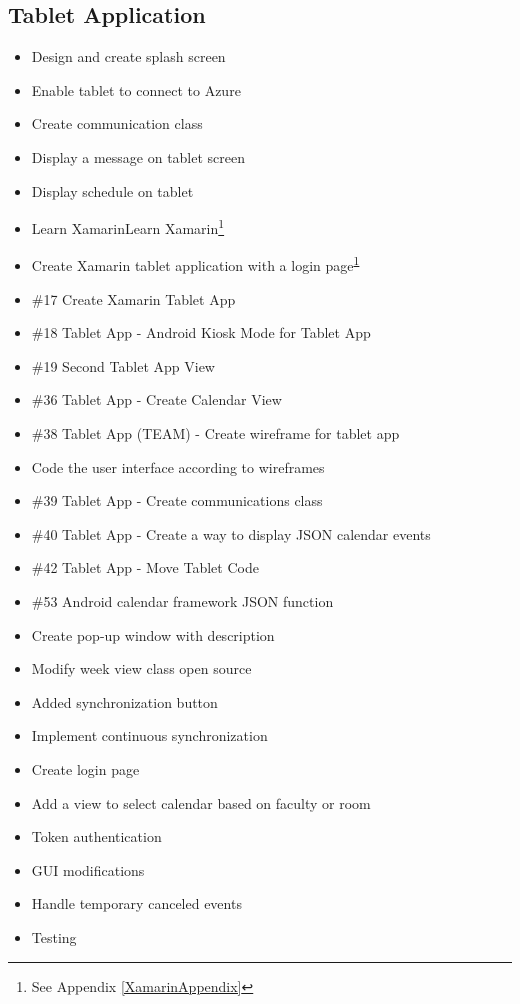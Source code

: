 \subsection*{Tablet Application}
\begin{itemize}
\item Design and create splash screen
\item Enable tablet to connect to Azure
\item Create communication class
\item Display a message on tablet screen
\item Display schedule on tablet	
\item Learn XamarinLearn Xamarin\footnote{See Appendix \ref{XamarinAppendix}\label{note4}}
\item Create Xamarin tablet application with a login page\textsuperscript{\ref{note4}}
\item \#17 Create Xamarin Tablet App
\item \#18 Tablet App - Android Kiosk Mode for Tablet App
\item \#19 Second Tablet App View
\item \#36 Tablet App - Create Calendar View
\item \#38 Tablet App (TEAM) - Create wireframe for tablet app
\item Code the user interface according to wireframes
\item \#39 Tablet App - Create communications class
\item \#40 Tablet App - Create a way to display JSON calendar events
\item \#42 Tablet App - Move Tablet Code
\item \#53 Android calendar framework JSON function
\item Create pop-up window with description
\item Modify week view class open source
\item Added synchronization button
\item Implement continuous synchronization
\item Create login page
\item Add a view to select calendar based on faculty or room
\item Token authentication
\item GUI modifications
\item Handle temporary canceled events
\item Testing
\end{itemize}

